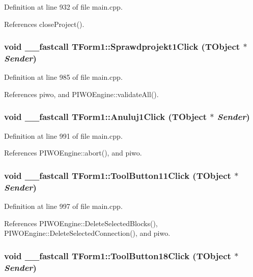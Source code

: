 Definition at line 932 of file main.cpp.

References closeProject().\hypertarget{classTForm1_285e94be246f0e0b2b04885d45ad5a77}{
\subsubsection[Sprawdprojekt1Click]{\setlength{\rightskip}{0pt plus 5cm}void \_\-\_\-fastcall TForm1::Sprawdprojekt1Click (TObject $\ast$ {\em Sender})}}
\label{classTForm1_285e94be246f0e0b2b04885d45ad5a77}




Definition at line 985 of file main.cpp.

References piwo, and PIWOEngine::validateAll().\hypertarget{classTForm1_0aebc36097cbddf910fe57cd0a2afa35}{
\subsubsection[Anuluj1Click]{\setlength{\rightskip}{0pt plus 5cm}void \_\-\_\-fastcall TForm1::Anuluj1Click (TObject $\ast$ {\em Sender})}}
\label{classTForm1_0aebc36097cbddf910fe57cd0a2afa35}




Definition at line 991 of file main.cpp.

References PIWOEngine::abort(), and piwo.\hypertarget{classTForm1_a171e9a7877c477410034b7e10ed9843}{
\subsubsection[ToolButton11Click]{\setlength{\rightskip}{0pt plus 5cm}void \_\-\_\-fastcall TForm1::ToolButton11Click (TObject $\ast$ {\em Sender})}}
\label{classTForm1_a171e9a7877c477410034b7e10ed9843}




Definition at line 997 of file main.cpp.

References PIWOEngine::DeleteSelectedBlocks(), PIWOEngine::DeleteSelectedConnection(), and piwo.\hypertarget{classTForm1_f9b33b7f20eeb63d7de3f5334db5e538}{
\subsubsection[ToolButton18Click]{\setlength{\rightskip}{0pt plus 5cm}void \_\-\_\-fastcall TForm1::ToolButton18Click (TObject $\ast$ {\em Sender})}}
\label{classTForm1_f9b33b7f20eeb63d7de3f5334db5e538}




